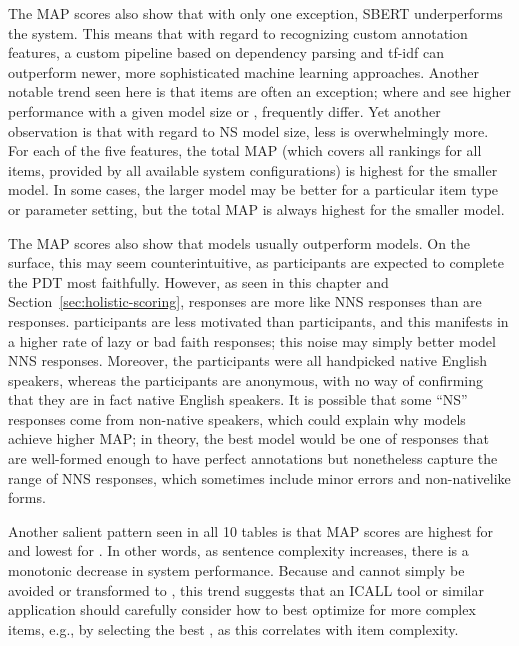 The MAP scores also show that with only one exception, SBERT underperforms the system. 
This means that with regard to recognizing custom annotation features, a custom pipeline based on dependency parsing and tf-idf can outperform newer, more sophisticated machine learning approaches.  Another notable trend seen here is that  items are often an exception; where  and  see higher performance with a given model size or ,  frequently differ. Yet another observation is that with regard to NS model size, less is overwhelmingly more. For each of the five features, the total MAP (which covers all rankings for all items, provided by all available system configurations) is highest for the smaller model. In some cases, the larger model may be better for a particular item type or parameter setting, but the total MAP is always highest for the smaller model.

The MAP scores also show that  models usually outperform  models. On the surface, this may seem counterintuitive, as  participants are expected to complete the PDT most faithfully. However, as seen in this chapter and Section~\ref{sec:holistic-scoring},  responses are more like NNS responses than are  responses.  participants are less motivated than  participants, and this manifests in a higher rate of lazy or bad faith responses; this noise may simply better model NNS responses. Moreover, the  participants were all handpicked native English speakers, whereas the  participants are anonymous, with no way of confirming that they are in fact native English speakers. It is possible that some ``NS'' responses come from non-native speakers, which could explain why  models achieve higher MAP; in theory, the best model would be one of responses that are well-formed enough to have perfect annotations but nonetheless capture the range of NNS responses, which sometimes include minor errors and non-nativelike forms.

Another salient pattern seen in all 10 tables is that MAP scores are highest for  and lowest for . In other words, as sentence complexity increases, there is a monotonic decrease in system performance. Because  and  cannot simply be avoided or transformed to , this trend suggests that an ICALL tool or similar application should carefully consider how to best optimize for more complex items, e.g., by selecting the best , as this correlates with item complexity.

